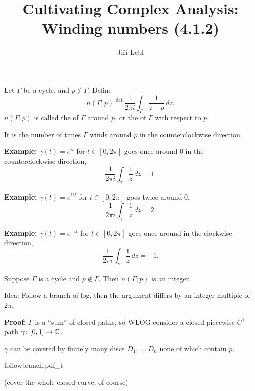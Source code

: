 \documentclass[10pt,aspectratio=169]{beamer}
\author{Ji\v{r}\'i Lebl}
\institute[OSU]{%
Departemento pri Matematiko de Oklahoma {\^S}tata Universitato}
\title{Cultivating Complex Analysis:\\%
Winding numbers (4.1.2)}
\date{}
\begin{document}
\begin{frame}
\titlepage
\end{frame}

\begin{frame}
Let $\Gamma$ be
a cycle,
and $p \notin \Gamma$.  Define
\begin{equation*}
n(\Gamma;p)
\overset{\text{def}}{=}
\frac{1}{2\pi i} \int_\Gamma \frac{1}{z-p} \, dz .
\end{equation*}
\pause
$n(\Gamma;p)$ is called the
\emph{} of $\Gamma$ around $p$, or
the 
\emph{} of $\Gamma$ with respect to $p$.

\medskip
\pause

It is the number of times $\Gamma$ winds around $p$ in the counterclockwise
direction.

\medskip
\pause

\textbf{Example:} $\gamma(t) = e^{it}$ for $t \in [0,2\pi]$ goes once around
$0$ in the counterclockwise direction,
\[
\frac{1}{2\pi i} \int_\gamma \frac{1}{z} \, dz = 1.
\]

\pause
\textbf{Example:} $\gamma(t) = e^{i2t}$ for $t \in [0,2\pi]$ goes twice around
$0$,
\[
\frac{1}{2\pi i} \int_\gamma \frac{1}{z} \, dz = 2.
\]

\pause
\textbf{Example:} $\gamma(t) = e^{-it}$ for $t \in [0,2\pi]$ goes once
around in the clockwise direction,
\[
\frac{1}{2\pi i} \int_\gamma \frac{1}{z} \, dz = -1.
\]
\end{frame}

\begin{frame}
\begin{proposition}
Suppose $\Gamma$ is a cycle and $p \notin \Gamma$.  Then
$n(\Gamma;p)$ is an integer.
\end{proposition}

\pause

Idea: Follow a branch of log, then the argument differs
by an integer multiple of $2\pi$.

\medskip
\pause
\textbf{Proof:}
$\Gamma$ is a ``sum'' of closed paths, so WLOG consider a closed
piecewise-$C^1$ path
$\gamma \colon [0,1] \to {\mathbb{C}}$.

\medskip
\pause

$\gamma$ can be covered by finitely many discs $D_1,\ldots,D_n$
none of which contain $p$.

\medskip
\begin{center}
{followbranch.pdf_t}
\end{center}

\pause
(cover the whole closed curve, of course)

\end{frame}
\end{document}
